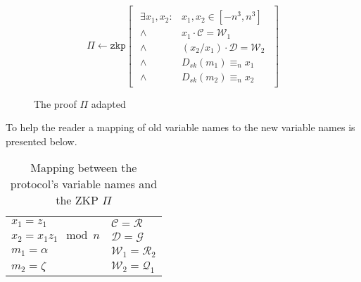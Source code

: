 \begin{figure}[h]
    \begin{table}[H]
      \centering
      \begin{footnotesize}
        \[
        \Pi \leftarrow \texttt{zkp} \begin{bmatrix}\begin{array}{lr}
                                      \exists x_1, x_2 : & x_1, x_2 \in [-n^3, n^3] \\
                                      \land & x_1 \cdot \mathcal{C} = \mathcal{W}_1 \\
                                      \land & (x_2/x_1) \cdot \mathcal{D} = \mathcal{W}_2 \\
                                      \land & D_{sk}(m_1) \equiv_n x_1 \\
                                      \land & D_{sk}(m_2) \equiv_n x_2
                                     \end{array}\end{bmatrix}
        \]
      \end{footnotesize}
    \end{table}

  \caption{The proof $\Pi$ adapted}
  \label{fig:theProofPi}
\end{figure}

To help the reader a mapping of old variable names to the new variable names is presented below.

\begin{table}[h]
  \begin{tabular}{p{4cm} l}
    $x_1 = z_1$ & $\mathcal{C} = \mathcal{R}$ \\
    $x_2 = x_1z_1 \mod n$ & $\mathcal{D} = \mathcal{G}$ \\
    $m_1 = \alpha$ & $\mathcal{W}_1 = \mathcal{R}_2$ \\
    $m_2 = \zeta$ & $\mathcal{W}_2 = \mathcal{Q}_1$
  \end{tabular}
  \caption{Mapping between the protocol's variable names and the ZKP $\Pi$}
  \label{fig:mappingOfVarNamesPi}
\end{table}

